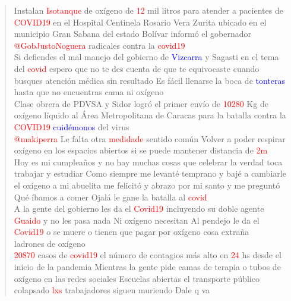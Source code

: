 \begin{quote}
	Instalan \textcolor{red}{Isotanque} de oxígeno de \textcolor{red}{12} mil litros para atender a pacientes de \textcolor{red}{COVID19} en el Hospital Centinela Rosario Vera Zurita ubicado en el municipio Gran Sabana del estado Bolívar informó el gobernador \textcolor{red}{@GobJustoNoguera} radicales contra la \textcolor{red}{covid19} 
	\vspace{12pt} \\
	Si defiendes el mal manejo del gobierno de \textcolor{blue}{Vizcarra} y Sagasti en el tema del \textcolor{red}{covid} espero que no te des cuenta de que te equivocaste cuando busques atención médica sin resultado Es fácil llenarse la boca de \textcolor{blue}{tonteras} hasta que no encuentras cama ni oxígeno 
	\vspace{12pt} \\
	Clase obrera de PDVSA y Sidor logró el primer envío de \textcolor{red}{10280} Kg de oxígeno líquido al Área Metropolitana de Caracas para la batalla contra la \textcolor{red}{COVID19} \textcolor{blue}{cuidémonos} del virus 
	\vspace{12pt} \\
	\textcolor{red}{@makiperra} Le falta otra \textcolor{red}{medidade} sentido común Volver a poder respirar oxígeno en los espacios abiertos si se puede mantener distancia de \textcolor{red}{2m} 
	\vspace{12pt} \\
	Hoy es mi cumpleaños y no hay muchas cosas que celebrar la verdad toca trabajar y estudiar Como siempre me levanté temprano y bajé a cambiarle el oxígeno a mi abuelita me felicitó y abrazo por mi santo y me preguntó Qué íbamos a comer Ojalá le gane la batalla al \textcolor{red}{covid} 
	\vspace{12pt} \\
	A la gente del gobierno les da el \textcolor{red}{Covid19} incluyendo su doble agente \textcolor{red}{Guaido} y no les pasa nada Ni oxígeno necesitan Al pendejo le da el \textcolor{red}{Covid19} o se muere o tienen que pagar por oxígeno cosa extraña 
	\vspace{12pt} \\
	ladrones de oxígeno 
	\vspace{12pt} \\
	\textcolor{red}{20870} casos de \textcolor{red}{covid19} el número de contagios más alto en \textcolor{red}{24} hs desde el inicio de la pandemia Mientras la gente pide camas de terapia o tubos de oxígeno en las redes sociales Escuelas abiertas el transporte público colapsado \textcolor{red}{lxs} trabajadores siguen muriendo Dale q va 

\end{quote}
